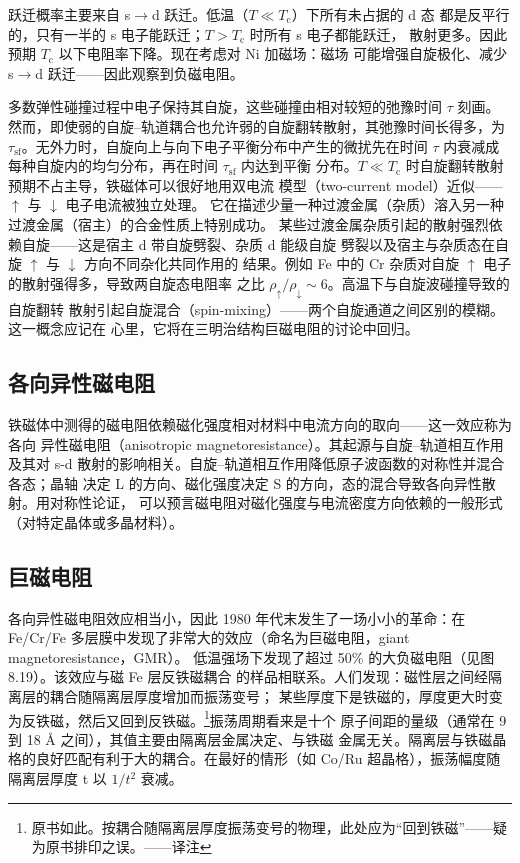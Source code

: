 跃迁概率主要来自 s$\to$d 跃迁。低温（$T\ll T_{\mathrm{c}}$）下所有未占据的 d 态
都是反平行的，只有一半的 s 电子能跃迁；$T>T_{\mathrm{c}}$ 时所有 s 电子都能跃迁，
散射更多。因此预期 $T_{\mathrm{c}}$ 以下电阻率下降。现在考虑对 Ni 加磁场：磁场
可能增强自旋极化、减少 s$\to$d 跃迁——因此观察到负磁电阻。

多数弹性碰撞过程中电子保持其自旋，这些碰撞由相对较短的弛豫时间 $\tau$ 刻画。
然而，即使弱的自旋--轨道耦合也允许弱的自旋翻转散射，其弛豫时间长得多，为
$\tau_{\mathrm{sf}}$。无外力时，自旋向上与向下电子平衡分布中产生的微扰先在时间
$\tau$ 内衰减成每种自旋内的均匀分布，再在时间 $\tau_{\mathrm{sf}}$ 内达到平衡
分布。$T\ll T_{\mathrm{c}}$ 时自旋翻转散射预期不占主导，铁磁体可以很好地用双电流
模型（two-current model）近似——$\uparrow$ 与 $\downarrow$ 电子电流被独立处理。
它在描述少量一种过渡金属（杂质）溶入另一种过渡金属（宿主）的合金性质上特别成功。
某些过渡金属杂质引起的散射强烈依赖自旋——这是宿主 d 带自旋劈裂、杂质 d 能级自旋
劈裂以及宿主与杂质态在自旋 $\uparrow$ 与 $\downarrow$ 方向不同杂化共同作用的
结果。例如 Fe 中的 Cr 杂质对自旋 $\uparrow$ 电子的散射强得多，导致两自旋态电阻率
之比 $\rho_{\uparrow}/\rho_{\downarrow}\sim6$。高温下与自旋波碰撞导致的自旋翻转
散射引起自旋混合（spin-mixing）——两个自旋通道之间区别的模糊。这一概念应记在
心里，它将在三明治结构巨磁电阻的讨论中回归。

\subsection{各向异性磁电阻}

铁磁体中测得的磁电阻依赖磁化强度相对材料中电流方向的取向——这一效应称为各向
异性磁电阻（anisotropic magnetoresistance）。其起源与自旋--轨道相互作用及其对
s-d 散射的影响相关。自旋--轨道相互作用降低原子波函数的对称性并混合各态；晶轴
决定 L 的方向、磁化强度决定 S 的方向，态的混合导致各向异性散射。用对称性论证，
可以预言磁电阻对磁化强度与电流密度方向依赖的一般形式（对特定晶体或多晶材料）。

\subsection{巨磁电阻}

各向异性磁电阻效应相当小，因此 1980 年代末发生了一场小小的革命：在 Fe/Cr/Fe
多层膜中发现了非常大的效应（命名为巨磁电阻，giant magnetoresistance，GMR）。
低温强场下发现了超过 50\% 的大负磁电阻（见图 8.19）。该效应与磁 Fe 层反铁磁耦合
的样品相联系。人们发现：磁性层之间经隔离层的耦合随隔离层厚度增加而振荡变号；
某些厚度下是铁磁的，厚度更大时变为反铁磁，然后又回到反铁磁。\footnote{原书如此。按耦合随隔离层厚度振荡变号的物理，此处应为“回到铁磁”——疑为原书排印之误。——译注}振荡周期看来是十个
原子间距的量级（通常在 9 到 18 \AA{} 之间），其值主要由隔离层金属决定、与铁磁
金属无关。隔离层与铁磁晶格的良好匹配有利于大的耦合。在最好的情形（如 Co/Ru
超晶格），振荡幅度随隔离层厚度 t 以 $1/t^{2}$ 衰减。

